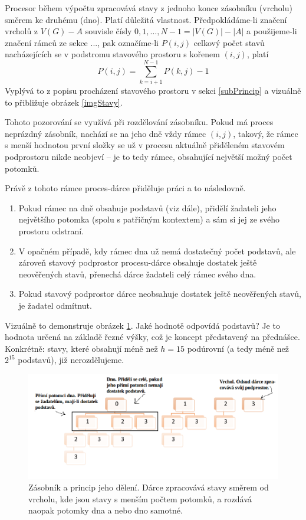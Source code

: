 \documentclass[12pt]{article}
\theoremstyle{definition}
\begin{document}
Procesor během výpočtu zpracovává stavy z jednoho konce zásobníku (vrcholu) směrem ke druhému (dno). Platí důležitá vlastnost. Předpokládáme-li
značení vrcholů z $V(G)-A$ souvisle čísly $0, 1, \dots, N - 1 = |V(G)| - |A|$ a
použijeme-li značení rámců ze sekce ..., pak označíme-li $P(i,j)$ celkový počet stavů nacházejících se v podstromu stavového prostoru
s kořenem $(i,j)$, platí
$$P(i,j)=\sum_{k=i+1}^{N-1}P(k,j)-1$$
Vyplývá to z popisu procházení stavového prostoru v sekci \ref{subPrincip} a vizuálně
to přibližuje obrázek \ref{imgStavy}.

Tohoto pozorování se využívá při rozdělování zásobníku. Pokud má proces neprázdný zásobník, nachází se na jeho dně vždy rámec $(i,j)$, takový, že rámec s menší hodnotou první složky
se už v procesu aktuálně přiděleném stavovém podprostoru nikde neobjeví -- je to tedy rámec, obsahující největší možný počet potomků.

Právě z tohoto rámce proces-dárce přiděluje práci a to následovně.
\begin{enumerate}
	\item Pokud rámec na dně obsahuje  podstavů (viz dále), přidělí žadateli
	jeho největšího potomka (spolu s patřičným kontextem) a sám si jej ze svého prostoru
	odstraní.
	\item V opačném případě, kdy rámec dna už nemá dostatečný počet podstavů, ale zároveň
	stavový podprostor procesu-dárce obsahuje dostatek ještě neověřených stavů, přenechá
	dárce žadateli celý rámec svého dna.
	\item Pokud stavový podprostor dárce neobsahuje dostatek ještě neověřených stavů,
	je žadatel odmítnut.
\end{enumerate}
Vizuálně to demonstruje obrázek \ref{imgSplit}.
Jaké hodnotě odpovídá  podstavů? Je to hodnota určená
na základě řezné výšky, což je koncept představený na přednášce. Konkrétně:
stavy, které obsahují méně než $h=15$ podúrovní (a tedy méně než $2^{15}$ podstavů), již nerozdělujeme.
\begin{figure}[ht]
	\centering
	\includegraphics[width=1.0\textwidth]{obr/deleni.png}
	\caption{Zásobník a princip jeho dělení. Dárce zpracovává stavy směrem od vrcholu, kde
		jsou stavy s menším počtem potomků, a rozdává naopak potomky dna a nebo dno samotné.}
	\label{imgSplit}
\end{figure}
\end{document}
